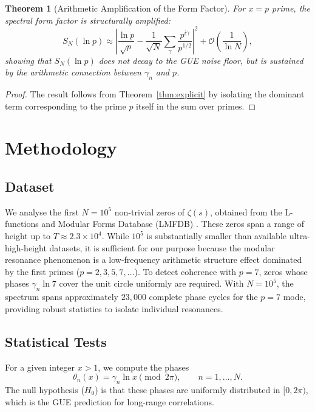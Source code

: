\documentclass[12pt,a4paper]{article}
\theoremstyle{plain}
\newtheorem{theorem}{Theorem}[section]
\theoremstyle{definition}
\theoremstyle{remark}
\begin{document}
\begin{theorem}[Arithmetic Amplification of the Form Factor]
\label{thm:amplification}
For \(x = p\) prime, the spectral form factor is structurally amplified:
\begin{equation}
S_N(\ln p) \approx \left| \frac{\ln p}{\sqrt{p}} - \frac{1}{\sqrt{N}} \sum_{\gamma} \frac{p^{i\gamma}}{p^{1/2}} \right|^2 + \mathcal{O}\left(\frac{1}{\ln N}\right),
\label{eq:amplification}
\end{equation}
showing that \(S_N(\ln p)\) does not decay to the GUE noise floor, but is sustained by the arithmetic connection between \(\gamma_n\) and \(p\).
\end{theorem}

\begin{proof}
The result follows from Theorem~\ref{thm:explicit} by isolating the dominant term corresponding to the prime \(p\) itself in the sum over primes.
\end{proof}

\section{Methodology}
\label{sec:methodology}

\subsection{Dataset}
We analyse the first \(N = 10^5\) non-trivial zeros of \(\zeta(s)\), obtained from the L-functions and Modular Forms Database (LMFDB) \cite{lmfdb}. These zeros span a range of height up to \(T \approx 2.3 \times 10^4\). While \(10^5\) is substantially smaller than available ultra-high-height datasets, it is sufficient for our purpose because the modular resonance phenomenon is a low-frequency arithmetic structure effect dominated by the first primes (\(p=2,3,5,7,\dots\)). To detect coherence with \(p=7\), zeros whose phases \(\gamma_n \ln 7\) cover the unit circle uniformly are required. With \(N=10^5\), the spectrum spans approximately \(23,000\) complete phase cycles for the \(p=7\) mode, providing robust statistics to isolate individual resonances.

\subsection{Statistical Tests}
For a given integer \(x > 1\), we compute the phases
\begin{equation}
\theta_n(x) = \gamma_n \ln x \pmod{2\pi}, \qquad n = 1,\dots,N.
\label{eq:phases}
\end{equation}
The null hypothesis (\(H_0\)) is that these phases are uniformly distributed in \([0, 2\pi)\), which is the GUE prediction for long-range correlations.
\end{document}
